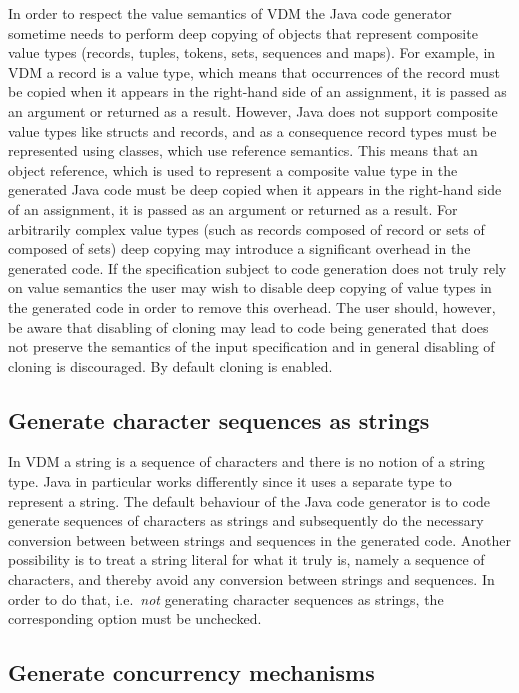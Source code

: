 In order to respect the value semantics of VDM the Java code generator
sometime needs to perform deep copying of objects that represent
composite value types (records, tuples, tokens, sets, sequences and
maps). For example, in VDM a record is a value type, which means that
occurrences of the record must be copied when it appears in the
right-hand side of an assignment, it is passed as an argument or
returned as a result. However, Java does not support composite value
types like structs and records, and as a consequence record types must
be represented using classes, which use reference semantics. This
means that an object reference, which is used to represent a composite
value type in the generated Java code must be deep copied when it
appears in the right-hand side of an assignment, it is passed as an
argument or returned as a result. For arbitrarily complex value types
(such as records composed of record or sets of composed of sets) deep
copying may introduce a significant overhead in the generated code. If
the specification subject to code generation does not truly rely on
value semantics the user may wish to disable deep copying of value
types in the generated code in order to remove this overhead. The user
should, however, be aware that disabling of cloning may lead to code
being generated that does not preserve the semantics of the input
specification and in general disabling of cloning is discouraged. By
default cloning is enabled.

\subsection{Generate character sequences as strings}
\label{sec:charseqs-as-strings}

In VDM a string is a sequence of characters and there is no notion of
a string type. Java in particular works differently since it uses a
separate type to represent a string. The default behaviour of the Java
code generator is to code generate sequences of characters as strings
and subsequently do the necessary conversion between between strings
and sequences in the generated code. Another possibility is to treat a
string literal for what it truly is, namely a sequence of characters,
and thereby avoid any conversion between strings and sequences. In
order to do that, i.e.\ \textit{not} generating character sequences as
strings, the corresponding option must be unchecked.

\subsection{Generate concurrency mechanisms}

